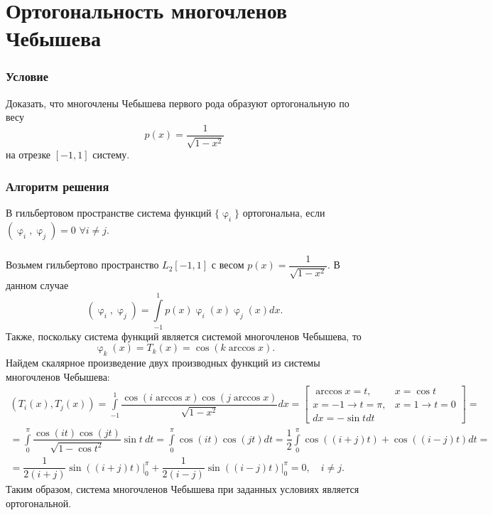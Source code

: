 \documentclass[a4paper, 12pt]{article}
\renewcommand{\varphi}{\upvarphi}
\begin{document}
	\section*{Ортогональность многочленов Чебышева}
	\subsubsection*{Условие}
	Доказать, что многочлены Чебышева первого рода образуют ортогональную по весу $$p(x)=\dfrac{1}{\sqrt{1-x^2}}$$ на отрезке $[-1, 1]$ систему.
	\subsubsection*{Алгоритм решения}
	В гильбертовом пространстве система функций $\{\varphi_i\}$ ортогональна, если $(\varphi_i, \varphi_j) =0$ $\forall i\ne j$. \\\\
	Возьмем гильбертово пространство $L_2[-1,1]$ с весом $p(x) = \dfrac{1}{\sqrt{1-x^2}}$. В данном случае $$(\varphi_i, \varphi_j) = \int\limits_{-1}^1 p(x)\varphi_i(x)\varphi_j(x) dx.$$
	Также, поскольку система функций является системой многочленов Чебышева, то $$\varphi_k(x) = T_k(x) = \cos (k\arccos x).$$
	Найдем скалярное произведение двух производных функций из системы многочленов Чебышева:
	\begin{multline*}
		(T_i(x), T_j(x)) = \int\limits_{-1}^1 \dfrac{\cos (i\arccos x)\cos(j \arccos x)}{\sqrt{1-x^2}} dx = \left[\begin{matrix}
			\arccos x = t, & x = \cos t\\
			x=-1 \to t=\pi, & x=1 \to t = 0\\
			dx = -\sin t dt
		\end{matrix}\right] =\\ = \int\limits_{0}^\pi \dfrac{\cos (it)\cos(j t)}{\sqrt{1-\cos t^2}}\sin t\ dt = \int\limits_{0}^\pi \cos (it)\cos(j t) dt = \dfrac12\int\limits_{0}^\pi \cos ((i+j)t)+\cos((i-j) t) dt=\\= \dfrac{1}{2(i+j)}\sin ((i+j)t)\Big|_0^\pi + \dfrac{1}{2(i-j)}\sin ((i-j)t)\Big|_0^\pi = 0,\quad i \ne j.
	\end{multline*}
	Таким образом, система многочленов Чебышева при заданных условиях является ортогональной.
	
\end{document}
